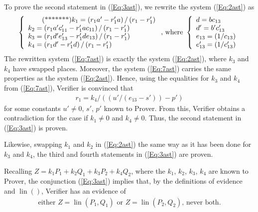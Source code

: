 \documentclass{mathcryptology} %
\DeclareMathOperator{\lin}{lin}
\theoremstyle{title}
\theoremstyle{titleof}
\renewenvironment{proof}{\noindent{\bfseries Proof:} }{}
\begin{document}
\begin{proof}
        To prove the second statement in (\ref{Eq:3ast}\label{***}), we rewrite the system (\ref{Eq:2ast}\label{**}) as
        \begin{equation*}
            \left\{
            \begin{array}{l}\label{Eq:7ast}\tag{*******}
            k_{1} = \left(r_{1} a' - r_{1}' a\right)                /\left(r_{1} - r_{1}'\right)\\
            k_{2} = \left(r_{1} a' c_{11}' - r_{1}' a c_{11}\right) /\left(r_{1} - r_{1}'\right)\\
            k_{3} = \left(r_{1} d' e_{13}' - r_{1}' d e_{13} \right) /\left(r_{1} - r_{1}'\right)\\
            k_{4} = \left(r_{1} d' - r_{1}' d\right)   /\left(r_{1} - r_{1}'\right)\\
            \end{array}\right. 
            \text{, where } \\
            \left\{
            \begin{array}{l}
            d=bc_{13}  \\
            d'=b'c_{13}' \\
            e_{13}=(1/c_{13}) \\
            e_{13}'=(1/c_{13}')
            \end{array}
            \right.                        
        \end{equation*}
        The rewritten system (\ref{Eq:7ast}\label{*******}) is exactly the system (\ref{Eq:2ast}\label{**}), where $k_{3}$ and $k_{4}$ have swapped places. Moreover, the system (\ref{Eq:7ast}\label{*******}) carries the same properties as the system (\ref{Eq:2ast}\label{**}). Hence, using the equalities for $k_{3}$ and $k_{4}$ from (\ref{Eq:7ast}\label{*******}), Verifier is convinced that
        \begin{align*}
        r_{1} = k_{4} / ((u' / (e_{13}-s'))-p')
        \end{align*}
        for some constants $u' \neq0$, $s'$, $p'$ known to Prover. From this, Verifier obtains a contradiction for the case if $k_{1}\neq0$ and $k_{4}\neq0$. Thus, the second statement in (\ref{Eq:3ast}\label{***}) is proven.
        
        Likewise, swapping $k_{1}$ and $k_{2}$ in (\ref{Eq:2ast}\label{**}) the same way as it has been done for $k_{3}$ and $k_{4}$, the third and fourth statements in (\ref{Eq:3ast}\label{***}) are proven.   

        Recalling $Z=k_{1}P_{1} + k_{2}Q_{1} + k_{3}P_{2} + k_{4}Q_{2}$, where the $k_{1}$, $k_{2}$, $k_{3}$, $k_{4}$ are known to Prover, the conjunction (\ref{Eq:3ast}\label{***}) implies that, by the definitions of evidence and $\lin()$, Verifier has an evidence of
        \begin{gather*}
        	\text{either $Z=\lin\left(P_{1}, Q_{1}\right)$ or $Z=\lin\left(P_{2}, Q_{2}\right)$, never both}.
        \end{gather*}


\end{proof}
\end{document}
